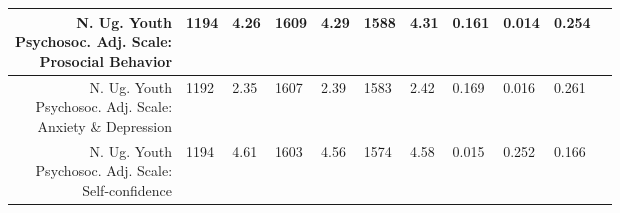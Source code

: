 \begin{longtable}{|r|l|l|l|l|l|l|l|l|l|l}
\hline

	 \makecell{N. Ug. Youth\\ Psychosoc. Adj. Scale:\\ Prosocial Behavior}             & 1194                                                               &  4.26                                                              & 1609                                                               &  4.29                                                              & 1588                                                               &  4.31                                                              & 0.161                                                              & 0.014                                                              & 0.254                                                             \\

\hline

	 \makecell{N. Ug. Youth\\ Psychosoc. Adj. Scale:\\ Anxiety \& Depression}           & 1192                                                                 &  2.35                                                                & 1607                                                                 &  2.39                                                                & 1583                                                                 &  2.42                                                                & 0.169                                                                & 0.016                                                                & 0.261                                                               \\

\hline

	 \makecell{N. Ug. Youth\\ Psychosoc. Adj. Scale:\\ Self-confidence}                & 1194                                                               &  4.61                                                              & 1603                                                               &  4.56                                                              & 1574                                                               &  4.58                                                              & 0.015                                                              & 0.252                                                              & 0.166                                                             \\


\end{longtable}

